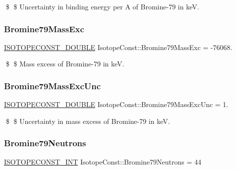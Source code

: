 \$ \$ Uncertainty in binding energy per A of Bromine-\/79 in keV. \mbox{\label{group___isotope_const-_bromine-_br79_gaebd9533abff22fd5f0f534d8f4d0d997}} 
\subsubsection{\texorpdfstring{Bromine79\+Mass\+Exc}{Bromine79MassExc}}
{\footnotesize\ttfamily \mbox{\hyperlink{group___isotope_const-_macros_ga8f45a7272ce02c0b4c65c44636ed719a}{I\+S\+O\+T\+O\+P\+E\+C\+O\+N\+S\+T\+\_\+\+D\+O\+U\+B\+LE}} Isotope\+Const\+::\+Bromine79\+Mass\+Exc = -\/76068.}

\$ \$ Mass excess of Bromine-\/79 in keV. \mbox{\label{group___isotope_const-_bromine-_br79_ga016f1c107875d8fe23c41fa6575b349e}} 
\subsubsection{\texorpdfstring{Bromine79\+Mass\+Exc\+Unc}{Bromine79MassExcUnc}}
{\footnotesize\ttfamily \mbox{\hyperlink{group___isotope_const-_macros_ga8f45a7272ce02c0b4c65c44636ed719a}{I\+S\+O\+T\+O\+P\+E\+C\+O\+N\+S\+T\+\_\+\+D\+O\+U\+B\+LE}} Isotope\+Const\+::\+Bromine79\+Mass\+Exc\+Unc = 1.}

\$ \$ Uncertainty in mass excess of Bromine-\/79 in keV. \mbox{\label{group___isotope_const-_bromine-_br79_ga83b2f3fe9c1d1b0b591b4c009b3a1fad}} 
\subsubsection{\texorpdfstring{Bromine79\+Neutrons}{Bromine79Neutrons}}
{\footnotesize\ttfamily \mbox{\hyperlink{group___isotope_const-_macros_ga5f18360b3e99483a35c32d789e62621c}{I\+S\+O\+T\+O\+P\+E\+C\+O\+N\+S\+T\+\_\+\+I\+NT}} Isotope\+Const\+::\+Bromine79\+Neutrons = 44}

